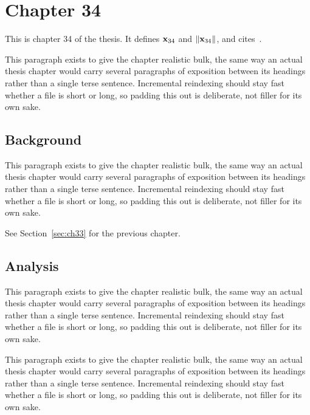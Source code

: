 \section{Chapter 34}
\label{sec:ch34}

This is chapter 34 of the thesis. It defines $\mathbf{x}_{34}$ and $\lVert \mathbf{x}_{34} \rVert$, and cites~\cite{ref1}.

This paragraph exists to give the chapter realistic bulk, the same way an actual thesis chapter would carry several paragraphs of exposition between its headings rather than a single terse sentence. Incremental reindexing should stay fast whether a file is short or long, so padding this out is deliberate, not filler for its own sake.

\subsection{Background}
\label{sec:ch34:background}

This paragraph exists to give the chapter realistic bulk, the same way an actual thesis chapter would carry several paragraphs of exposition between its headings rather than a single terse sentence. Incremental reindexing should stay fast whether a file is short or long, so padding this out is deliberate, not filler for its own sake.

See Section~\ref{sec:ch33} for the previous chapter.

\subsection{Analysis}
\label{sec:ch34:analysis}

This paragraph exists to give the chapter realistic bulk, the same way an actual thesis chapter would carry several paragraphs of exposition between its headings rather than a single terse sentence. Incremental reindexing should stay fast whether a file is short or long, so padding this out is deliberate, not filler for its own sake.

This paragraph exists to give the chapter realistic bulk, the same way an actual thesis chapter would carry several paragraphs of exposition between its headings rather than a single terse sentence. Incremental reindexing should stay fast whether a file is short or long, so padding this out is deliberate, not filler for its own sake.
